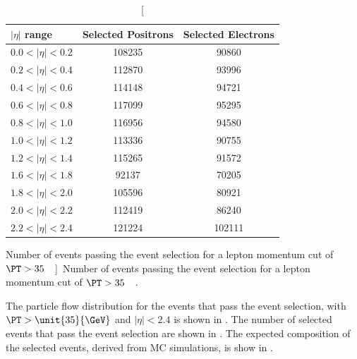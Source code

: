 \begin{table}[htbp]
 \begin{center}
 \begin{tabular}{lcc}
\toprule
 $|\eta|$ range & Selected Positrons & Selected Electrons\\
 \midrule
 $0.0<| \eta |<0.2$ & 108235 &  90860 \\
 $0.2<| \eta |<0.4$ & 112870 &  93996 \\
 $0.4<| \eta |<0.6$ & 114148 &  94721 \\
 $0.6<| \eta |<0.8$ & 117099 &  95295 \\
 $0.8<| \eta |<1.0$ & 116956 &  94580 \\
 $1.0<| \eta |<1.2$ & 113336 &  90755 \\
 $1.2<| \eta |<1.4$ & 115265 &  91572 \\
 $1.6<| \eta |<1.8$ &  92137 &  70205 \\
 $1.8<| \eta |<2.0$ & 105596 &  80921 \\
 $2.0<| \eta |<2.2$ & 112419 &  86240 \\
 $2.2<| \eta |<2.4$ & 121224 & 102111 \\
\bottomrule
 \end{tabular}
 \caption[Number of events passing the event selection for a lepton momentum cut
 of \unit{$\PT>35$}{\GeV}]{Number of events passing the event selection for a lepton momentum cut
 of \unit{$\PT>35$}{\GeV} \cite{bendavid2011electron}.}
\label{tab:updatedselectedevents}
\end{center}
\end{table}

The particle flow \ETm distribution for the events that pass the event
selection, with $\PT > \unit{35}{\GeV}$ and $|\eta| < 2.4$ is shown in
.
The number of selected events that pass the event selection are shown in
. 
The expected composition of the selected events, derived from MC simulations, is
show in . 

